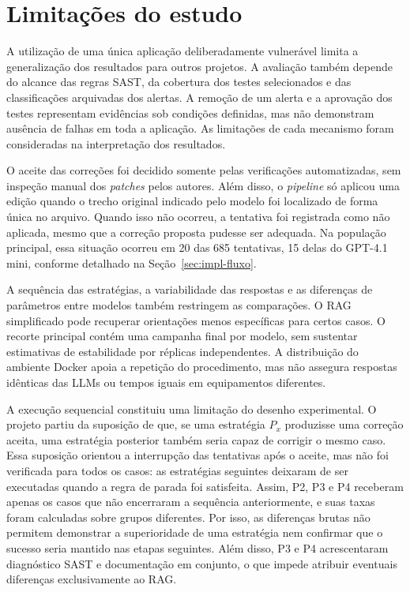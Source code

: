 \section{Limitações do estudo}
\label{sec:met-limitacoes}

A utilização de uma única aplicação deliberadamente vulnerável limita a generalização dos resultados para outros projetos. A avaliação também depende do alcance das regras SAST, da cobertura dos testes selecionados e das classificações arquivadas dos alertas. A remoção de um alerta e a aprovação dos testes representam evidências sob condições definidas, mas não demonstram ausência de falhas em toda a aplicação. As limitações de cada mecanismo foram consideradas na interpretação dos resultados.

O aceite das correções foi decidido somente pelas verificações automatizadas, sem inspeção manual dos \textit{patches} pelos autores. Além disso, o \textit{pipeline} só aplicou uma edição quando o trecho original indicado pelo modelo foi localizado de forma única no arquivo. Quando isso não ocorreu, a tentativa foi registrada como não aplicada, mesmo que a correção proposta pudesse ser adequada. Na população principal, essa situação ocorreu em 20 das 685 tentativas, 15 delas do GPT-4.1 mini, conforme detalhado na Seção~\ref{sec:impl-fluxo}.

A sequência das estratégias, a variabilidade das respostas e as diferenças de parâmetros entre modelos também restringem as comparações. O RAG simplificado pode recuperar orientações menos específicas para certos casos. O recorte principal contém uma campanha final por modelo, sem sustentar estimativas de estabilidade por réplicas independentes. A distribuição do ambiente Docker apoia a repetição do procedimento, mas não assegura respostas idênticas das LLMs ou tempos iguais em equipamentos diferentes.

A execução sequencial constituiu uma limitação do desenho experimental. O projeto partiu da suposição de que, se uma estratégia $P_x$ produzisse uma correção aceita, uma estratégia posterior também seria capaz de corrigir o mesmo caso. Essa suposição orientou a interrupção das tentativas após o aceite, mas não foi verificada para todos os casos: as estratégias seguintes deixaram de ser executadas quando a regra de parada foi satisfeita. Assim, P2, P3 e P4 receberam apenas os casos que não encerraram a sequência anteriormente, e suas taxas foram calculadas sobre grupos diferentes. Por isso, as diferenças brutas não permitem demonstrar a superioridade de uma estratégia nem confirmar que o sucesso seria mantido nas etapas seguintes. Além disso, P3 e P4 acrescentaram diagnóstico SAST e documentação em conjunto, o que impede atribuir eventuais diferenças exclusivamente ao RAG.

